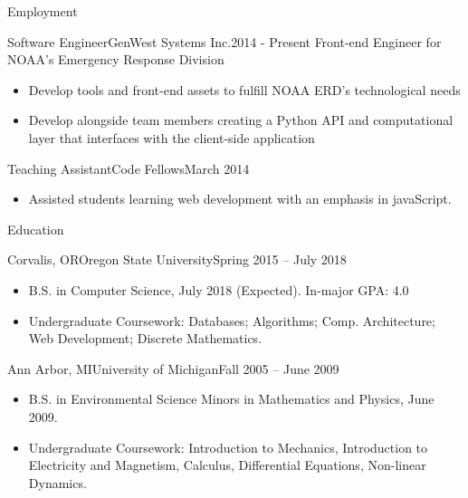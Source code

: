 \documentclass[]{mcdowellcv}
\begin{document}
	\makeheader
	
	\begin{cvsection}{Employment}
		\begin{cvsubsection}{Software Engineer}{GenWest Systems Inc.}{2014 - Present}
			Front-end Engineer for NOAA's Emergency Response Division			
			\begin{itemize}
				\item Develop tools and front-end assets to fulfill NOAA ERD's technological needs 
				\item Develop alongside team members creating a Python API and computational layer that interfaces with the client-side application
			\end{itemize}
		\end{cvsubsection}
		
		\begin{cvsubsection}{Teaching Assistant}{Code Fellows}{March 2014}	
			\begin{itemize}
				\item Assisted students learning web development with an emphasis in javaScript.
			\end{itemize}
		\end{cvsubsection}
	\end{cvsection}
	
	\begin{cvsection}{Education}
		\begin{cvsubsection}{Corvalis, OR}{Oregon State University}{Spring 2015 -- July 2018}
			\begin{itemize}
        \item B.S. in Computer Science, July 2018 (Expected).  In-major GPA: 4.0
				\item Undergraduate Coursework: Databases; Algorithms; Comp. Architecture; Web Development; Discrete Mathematics.
			\end{itemize}
		\end{cvsubsection}
    \begin{cvsubsection}{Ann Arbor, MI}{University of Michigan}{Fall 2005 -- June 2009}
      \begin{itemize}
        \item B.S. in Environmental Science Minors in Mathematics and Physics, June 2009. 
        \item Undergraduate Coursework: Introduction to Mechanics, Introduction to Electricity and Magnetism, Calculus, Differential Equations, Non-linear Dynamics.
      \end{itemize}
    \end{cvsubsection}
	\end{cvsection}
	
\end{document}
